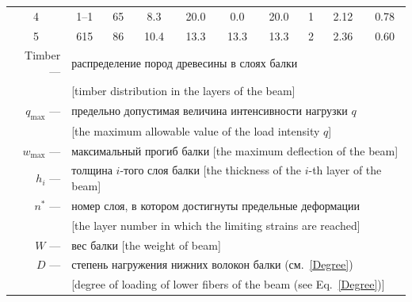 \begin{table}[b!]
\begin{tabular}{c|c|c|c|c|c|c|c|c|c}
4 & 1--1 & 65 & 8.3 & 20.0 & 0.0 & 20.0 & 1  & 2.12 & 0.78 \\

5 &  615 & 86 & 10.4 & 13.3 & 13.3 & 13.3 & 2  & 2.36 & 0.60 \\

             \hline

             

\multicolumn{1}{r}{\rule{0mm}{12pt}Timber ---} & \multicolumn{9}{l}{распределение пород древесины в слоях балки}\\

\multicolumn{1}{r}{} & \multicolumn{9}{l}{[timber distribution  in the layers of the beam]}\\[1mm]



\multicolumn{1}{r}{$q_{\max}$ ---} & \multicolumn{9}{l}{предельно допустимая величина интенсивности нагрузки $q$}\\

\multicolumn{1}{r}{} & \multicolumn{9}{l}{[the maximum allowable value of the load intensity $ q $]}\\[1mm]



\multicolumn{1}{r}{$w_{\max}$ ---} & \multicolumn{9}{l}{максимальный прогиб балки [the maximum deflection of the beam]}\\[1mm]



\multicolumn{1}{r}{$h_i$ ---} & \multicolumn{9}{l}{толщина $i$-того слоя балки  [the thickness of the $i$-th layer of the beam]}\\[1mm]



\multicolumn{1}{r}{$n^*$ ---} & \multicolumn{9}{l}{номер слоя, в котором достигнуты предельные деформации}\\

\multicolumn{1}{r}{} & \multicolumn{9}{l}{[the layer number in which the limiting strains are reached]}\\[1mm]



\multicolumn{1}{r}{$W$ ---} & \multicolumn{9}{l}{вес балки  [the weight of beam]}\\[1mm]





\multicolumn{1}{r}{$D$ ---} & \multicolumn{9}{l}{степень нагружения нижних волокон балки (см.~\eqref{Degree})}\\

\multicolumn{1}{r}{} & \multicolumn{9}{l}{[degree of loading of  lower fibers of the beam (see Eq.~\eqref{Degree})]}\\[1mm]





	

        \end{tabular}









\end{table} 
